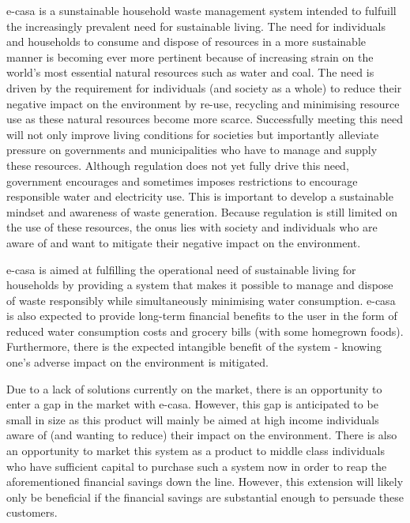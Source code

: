 \documentclass[a4paper,11pt,fleqn]{report}
\begin{document}
\ac{e-casa} is a sunstainable household waste management system intended to fulfuill the increasingly prevalent need for sustainable living. The need for individuals and households to consume and dispose of resources in a more sustainable manner is becoming ever more pertinent because of increasing strain on the world's most essential natural resources such as water and coal. The need is driven by the requirement for individuals (and society as a whole) to reduce their negative impact on the environment by re-use, recycling and minimising resource use as these natural resources become more scarce. Successfully meeting this need will not only improve living conditions for societies but importantly alleviate pressure on governments and municipalities who have to manage and supply these resources.
Although regulation does not yet fully drive this need, government encourages and sometimes imposes restrictions to encourage responsible water and electricity use. This is important to develop a sustainable mindset and awareness of waste generation. Because regulation is still limited on the use of these resources, the onus lies with society and individuals who are aware of and want to mitigate their negative impact on the environment.

\ac{e-casa} is aimed at fulfilling the operational need of sustainable living for households by providing a system that makes it possible to manage and dispose of waste responsibly while simultaneously minimising water consumption. \ac{e-casa} is also expected to provide long-term financial benefits to the user in the form of reduced water consumption costs and grocery bills (with some homegrown foods). Furthermore, there is the expected intangible benefit of the system - knowing one's adverse impact on the environment is mitigated.

Due to a lack of solutions currently on the market, there is an opportunity to enter a gap in the market with \ac{e-casa}. However, this gap is anticipated to be small in size as this product will mainly be aimed at high income individuals aware of (and wanting to reduce) their impact on the environment. There is also an opportunity to market this system as a product to middle class individuals who have sufficient capital to purchase such a system now in order to reap the aforementioned financial savings down the line. However, this extension will likely only be beneficial if the financial savings are substantial enough to persuade these customers.\\
\end{document}
